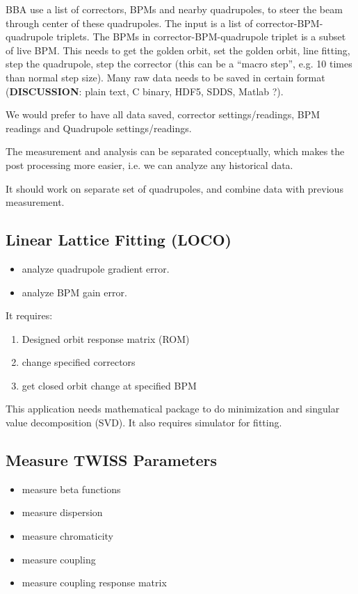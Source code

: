 \documentclass[letterpaper,showtrims]{memoir}
\newcommand{\strong}[1]{{\bfseries #1}}
\begin{document}
BBA use a list of correctors, BPMs and nearby quadrupoles, to steer the
beam through center of these quadrupoles. The input is a list of
corrector-BPM-quadrupole triplets.  The BPMs in corrector-BPM-quadrupole
triplet is a subset of live BPM.  This needs to get the golden orbit,
set the golden orbit, line fitting, step the quadrupole, step the
corrector (this can be a ``macro step'', e.g. 10 times than normal step
size). Many raw data needs to be saved in certain format (\strong{DISCUSSION}:
plain text, C binary, HDF5, SDDS, Matlab ?).

We would prefer to have all data saved, corrector settings/readings, BPM
readings and Quadrupole settings/readings.

The measurement and analysis can be separated conceptually, which makes the
post processing more easier, i.e. we can analyze any historical data. 

It should work on separate set of quadrupoles, and combine data with previous measurement.

\subsection{Linear Lattice Fitting (LOCO)}

\begin{itemize}%
\item analyze quadrupole gradient error.
\item analyze BPM gain error.
\end{itemize}

It requires:
\begin{enumerate}
\item Designed orbit response matrix (ROM)
\item change specified correctors 
\item get closed orbit change at specified BPM
\end{enumerate}

This application needs mathematical package to do minimization and
singular value decomposition (SVD). It also requires simulator for
fitting.

\subsection{Measure TWISS Parameters}

\begin{itemize}%
\item measure beta functions
\item measure dispersion
\item measure chromaticity
\item measure coupling
\item measure coupling response matrix
\end{itemize}
\end{document}
